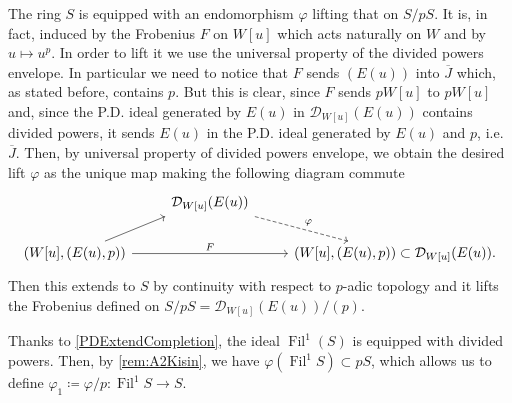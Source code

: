 \begin{rem}[]\label{rem:liftFrobeniusS}
	The ring $S$ is equipped with an endomorphism $\varphi$ lifting that on $S/pS$.
	It is, in fact, induced by the Frobenius \(F\) on $W[u]$ which acts naturally
	on $W$ and by $u \mapsto u^p$.
	In order to lift it we use the universal property of
	the divided powers envelope.
	In particular we need to notice that \(F\) sends $(E(u))$
	into $\overline{J}$ which, as stated before, contains $p$.
	But this is clear, since $F$ sends $pW[u]$ to $pW[u]$ and, 
	since the P.D. ideal generated by $E(u)$ in $\mathcal{D}_{W[u]}(E(u))$
	contains divided powers, it sends $E(u)$ in the P.D. ideal
	generated by $E(u)$ and $p$, i.e$.$ \(\overline{J}\).
	Then, by universal property of divided powers envelope, we obtain the desired 
	lift $\varphi$ as the unique map making the following diagram commute
	\begin{equation*}
	\begin{tikzcd}
		&
		\mathcal{D}_{W[u]}(E(u))
		\arrow[rd, "\varphi", dashrightarrow,
		start anchor=south east] & \\
		\left( W[u], (E(u),p)\right) \arrow[ru, "", rightarrow,
		end anchor=south west] 
		\arrow[rr, "F", rightarrow] & &
		\left( W[u], (E(u),p)\right) \subset
		\mathcal{D}_{W[u]}(E(u)). 
	\end{tikzcd}
	\end{equation*}
	Then this extends to $S$ by continuity with respect to $p$-adic
	topology and it lifts the Frobenius defined on
	$S/pS = \mathcal{D}_{W[u]}(E(u))/ (p)$.
\end{rem}


\begin{ntt}[]\label{not:phi1S}
	Thanks to \cref{PDExtendCompletion}, the ideal 
	$\operatorname{Fil}^1(S)$ is equipped with divided powers.
	Then, by \cref{rem:A2Kisin}, 
	we have $\varphi( \operatorname{Fil}^1 S) \subset p S$, which
	allows us to define $\varphi_1 \coloneqq \varphi/p\colon
	\operatorname{Fil}^1S \to S$.
\end{ntt}


